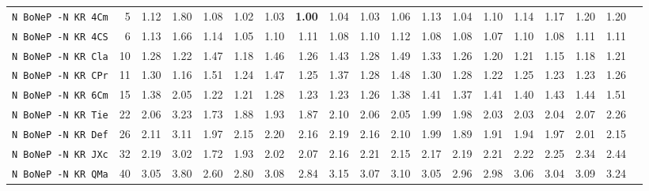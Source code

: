 \begin{tabular}{l | r @{~~} r | r@{~~}r@{~~}r@{~~}r@{~~}r@{~~}r@{~~}r@{~~}r@{~~}r@{~~}r@{~~}r@{~~}r@{~~}r@{~~}r@{~~}r@{~~}r|}
\verb+N BoNeP -N KR 4Cm+ & 5 & 1.12 & 1.80&1.08&1.02&1.03&\textbf{1.00}&1.04&1.03&1.06&1.13&1.04&1.10&1.14&1.17&1.20&1.20\\
\verb+N BoNeP -N KR 4CS+ & 6 & 1.13 & 1.66&1.14&1.05&1.10&1.11&1.08&1.10&1.12&1.08&1.08&1.07&1.10&1.08&1.11&1.11\\
\verb+N BoNeP -N KR Cla+ & 10 & 1.28 & 1.22&1.47&1.18&1.46&1.26&1.43&1.28&1.49&1.33&1.26&1.20&1.21&1.15&1.18&1.21\\
\verb+N BoNeP -N KR CPr+ & 11 & 1.30 & 1.16&1.51&1.24&1.47&1.25&1.37&1.28&1.48&1.30&1.28&1.22&1.25&1.23&1.23&1.26\\
\verb+N BoNeP -N KR 6Cm+ & 15 & 1.38 & 2.05&1.22&1.21&1.28&1.23&1.23&1.26&1.38&1.41&1.37&1.41&1.40&1.43&1.44&1.51\\
\verb+N BoNeP -N KR Tie+ & 22 & 2.06 & 3.23&1.73&1.88&1.93&1.87&2.10&2.06&2.05&1.99&1.98&2.03&2.03&2.04&2.07&2.26\\
\verb+N BoNeP -N KR Def+ & 26 & 2.11 & 3.11&1.97&2.15&2.20&2.16&2.19&2.16&2.10&1.99&1.89&1.91&1.94&1.97&2.01&2.15\\
\verb+N BoNeP -N KR JXc+ & 32 & 2.19 & 3.02&1.72&1.93&2.02&2.07&2.16&2.21&2.15&2.17&2.19&2.21&2.22&2.25&2.34&2.44\\
\verb+N BoNeP -N KR QMa+ & 40 & 3.05 & 3.80&2.60&2.80&3.08&2.84&3.15&3.07&3.10&3.05&2.96&2.98&3.06&3.04&3.09&3.24\\
\end{tabular}
